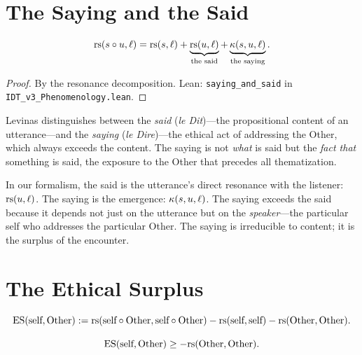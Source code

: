 \section{The Saying and the Said}

\begin{theorem}
\label{thm:saying-said}
\[
\mathrm{rs}(s \circ u, \ell) = \mathrm{rs}(s, \ell) + \underbrace{\mathrm{rs}(u, \ell)}_{\text{the said}} +
\underbrace{\kappa(s, u, \ell)}_{\text{the saying}}.
\]
\end{theorem}

\begin{proof}
By the resonance decomposition.
Lean: \texttt{saying\_and\_said} in \texttt{IDT\_v3\_Phenomenology.lean}.
\end{proof}

\begin{interpretation}
Levinas distinguishes between the \emph{said} (\textit{le Dit})---the
propositional content of an utterance---and the \emph{saying} (\textit{le Dire})---the
ethical act of addressing the Other, which always exceeds the content. The
saying is not \emph{what} is said but the \emph{fact that} something is said,
the exposure to the Other that precedes all thematization.

In our formalism, the said is the utterance's direct resonance with the
listener: $\mathrm{rs}(u, \ell)$. The saying is the emergence: $\kappa(s, u, \ell)$.
The saying exceeds the said because it depends not just on the utterance but
on the \emph{speaker}---the particular self who addresses the particular Other.
The saying is irreducible to content; it is the surplus of the encounter.
\end{interpretation}

\section{The Ethical Surplus}

\begin{definition}
\label{def:ethical-surplus}
\[
\mathrm{ES}(\text{self}, \text{Other}) := \mathrm{rs}(\text{self} \circ \text{Other}, \text{self} \circ \text{Other}) - \mathrm{rs}(\text{self}, \text{self}) - \mathrm{rs}(\text{Other}, \text{Other}).
\]
\end{definition}

\begin{theorem}
\label{thm:ethical-surplus}
\[
\mathrm{ES}(\text{self}, \text{Other}) \geq -\mathrm{rs}(\text{Other}, \text{Other}).
\]
\end{theorem}

